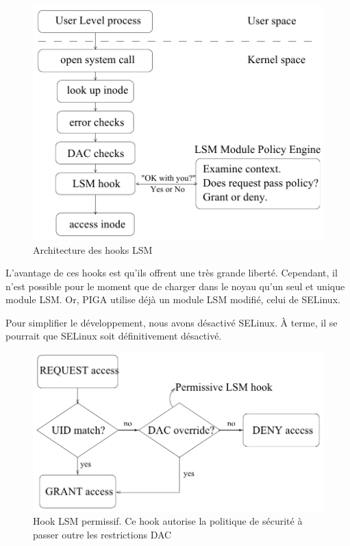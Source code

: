 \documentclass[pdftex,a4paper,titlepage,11pt,openright]{article}
\begin{document}
\begin{figure}[hb]
	\centering
	\includegraphics[scale=0.45]{lsm1.png}
	\caption{Architecture des hooks LSM \cite{LSMINTRO}}
\end{figure}

L'avantage de ces hooks est qu'ils offrent une très grande liberté. Cependant, il n'est possible pour le moment que de charger dans le noyau qu'un seul et unique module LSM. Or, PIGA utilise déjà un module LSM modifié, celui de SELinux.

Pour simplifier le développement, nous avons désactivé SELinux. \`A terme, il se pourrait que SELinux soit définitivement désactivé.

\begin{figure}%
	\centering
	\includegraphics[scale=0.45]{lsm2.png}
	\caption{Hook LSM permissif. Ce hook autorise la politique de sécurité à passer outre les restrictions DAC \cite{LSMINTRO}}
\end{figure}
\end{document}
